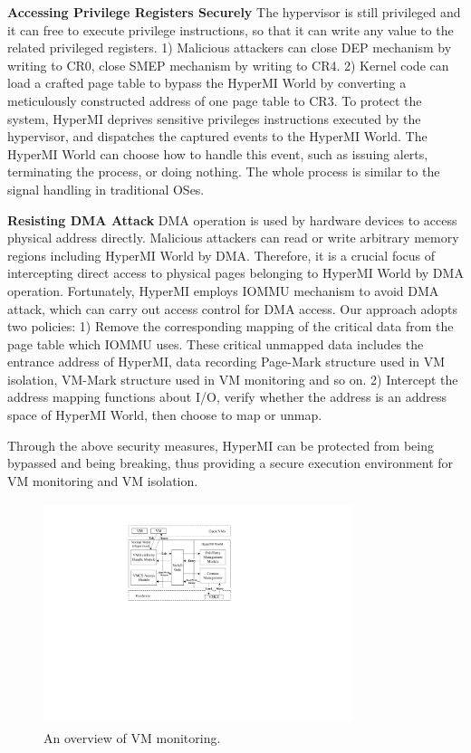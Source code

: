 \documentclass[conference]{IEEEtran}
\begin{document}
\fi

\textbf{Accessing Privilege Registers Securely}
The hypervisor is still privileged and it can free to execute privilege instructions, so that it can write any value to the related privileged registers. 1) Malicious attackers can close DEP mechanism by writing to CR0, close SMEP mechanism by writing to CR4. 2) Kernel code can load a crafted page table to bypass the HyperMI World by converting a meticulously constructed address of one page table to CR3.
To protect the system, HyperMI deprives sensitive privileges instructions executed by the hypervisor, and dispatches the captured events to the HyperMI World. The HyperMI World can choose how to handle this event, such as issuing alerts, terminating the process, or doing nothing. The whole process is similar to the signal handling in traditional OSes.

\textbf{Resisting DMA Attack}
DMA operation is used by hardware devices to access physical address directly. Malicious attackers can read or write arbitrary memory regions including HyperMI World by DMA. Therefore, it is a crucial focus of intercepting direct access to physical pages belonging to HyperMI World by DMA operation. 
Fortunately, HyperMI employs IOMMU mechanism to avoid DMA attack, which can carry out access control for DMA access. Our approach adopts two policies: 1) Remove the corresponding mapping of the critical data from the page table which IOMMU uses. These critical unmapped data includes the entrance address of HyperMI, data recording Page-Mark structure used in VM isolation, VM-Mark structure used in VM monitoring and so on. 2) Intercept the address mapping functions about I/O, verify whether the address is an address space of HyperMI World, then choose to map or unmap.


Through the above security measures, HyperMI can be protected from being bypassed and being breaking, thus providing a secure execution environment for VM monitoring and VM isolation.














\iffalse
\begin{figure}
\centerline{\includegraphics[width=9cm,height=6.5cm]{pdfvmcs4.pdf}}%
\caption{An overview of VM monitoring.} \label{fig4}
\end{figure}
\end{document}
